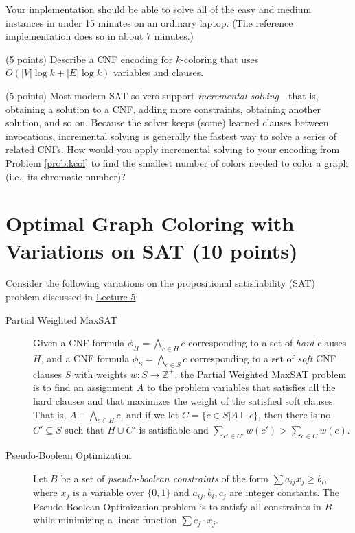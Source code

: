 \documentclass{handout}
\begin{document}
\begin{questions}
Your implementation should be able to solve all of the easy and medium instances in under 15 minutes on an ordinary laptop.
(The reference implementation does so in about 7 minutes.)



\item (5 points) Describe a CNF encoding for $k$-coloring that uses $O(|V|\log k+|E|\log k)$ variables and clauses.



\item (5 points) Most modern SAT solvers support \emph{incremental solving}---that is, obtaining a solution to a CNF, adding more constraints, obtaining another solution, and so on.  Because the solver keeps (some) learned clauses between invocations, incremental solving is  generally the fastest way to solve a series of related CNFs.  How would you apply incremental solving to your encoding from Problem \ref{prob:kcol} to find the smallest number of colors needed to color a graph (i.e., its chromatic number)?  \label{prob:last}


\end{questions}

\pagebreak

\section{Optimal Graph Coloring with Variations on SAT (10 points)}\label{varsat}

\newcommand\pwm{pwMaxSAT}
\newcommand\tocnf{\operatorname{toCNF}}

Consider the following variations on the propositional satisfiability (SAT) problem discussed in \href{\website/doc/L05.pdf}{Lecture 5}:

\begin{description}

\item[Partial Weighted MaxSAT] Given a CNF formula $\phi_H = \bigwedge_{c \in H} c$ corresponding to a set of \emph{hard} clauses $H$, and a CNF formula $\phi_S = \bigwedge_{c \in S} c$ corresponding to a set of \emph{soft} CNF clauses $S$ with weights $w : S \rightarrow \mathbb{Z^+}$, the Partial Weighted MaxSAT problem is to find an assignment $A$ to the problem variables that satisfies all the hard clauses and that maximizes the weight of the satisfied soft clauses. That is, $A \models \bigwedge_{c \in H} c$, and if we let $C = \{ c\in S | A\models c\}$, then there is no $C'\subseteq S$ such that $H\cup C'$ is satisfiable and $\sum_{c'\in C'} w(c') > \sum_{c\in C} w(c)$.

\item[Pseudo-Boolean Optimization]  Let $B$ be a set of \emph{pseudo-boolean constraints} of the form $\sum a_{ij}x_j \geq b_i$, where $x_j$ is a variable over $\{0, 1\}$ and $a_{ij}, b_i, c_j$ are integer constants.  The Pseudo-Boolean Optimization problem is to satisfy all constraints in $B$ while minimizing a linear function $\sum c_j \cdot x_j$.
\end{description}
%
\end{document}
